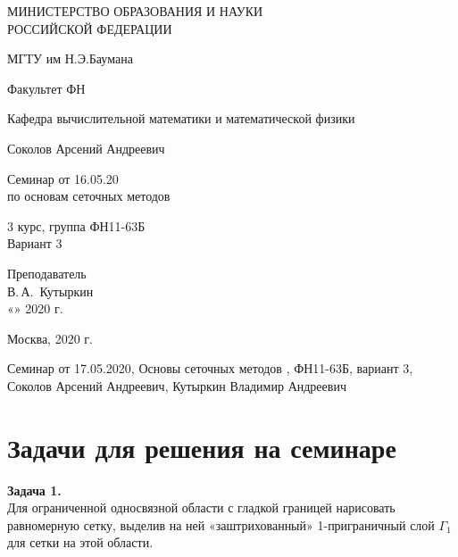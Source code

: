 \documentclass[14pt,a4paper]{scrartcl}
\begin{document}
	\begin{titlepage}
		\begin{center}
			\large
			МИНИСТЕРСТВО ОБРАЗОВАНИЯ И НАУКИ\\ РОССИЙСКОЙ ФЕДЕРАЦИИ
			
			\vspace{0.5cm}
			
			МГТУ им Н.Э.Баумана
			\vspace{0.25cm}
			
			Факультет ФН
			
			Кафедра вычислительной математики и математической физики
			\vfill
			
			
			Соколов Арсений Андреевич\\
			\vfill
			
			
			{\LARGE Семинар от 16.05.20\\ по основам сеточных методов \\[2mm]
			}
			\bigskip
			
			3 курс, группа ФН11-63Б\\
			Вариант 3
		\end{center}
		\vfill
		
		\newlength{\ML}
		\hfill\begin{minipage}{0.4\textwidth}
			Преподаватель\\
			\underline{\hspace{3cm}} В.\,А.~Кутыркин\\
			«\underline{\hspace{0.7cm}}» \underline{\hspace{1.71cm}} 2020 г.
		\end{minipage}%
		\bigskip
		
		
		\vfill
		
		\begin{center}
			Москва, 2020 г.
		\end{center}
	\end{titlepage}
	Семинар от 17.05.2020, Основы сеточных методов , ФН11-63Б, вариант 3,
	Соколов Арсений Андреевич, Кутыркин Владимир Андреевич
	
	\section*{Задачи для решения на семинаре}
	
	\textbf{Задача 1.}\\ Для ограниченной односвязной области с гладкой границей нарисовать равномерную сетку, выделив на ней «заштрихованный» 1-приграничный слой $\Gamma_1 $ для сетки на этой области.
	
\end{document}
